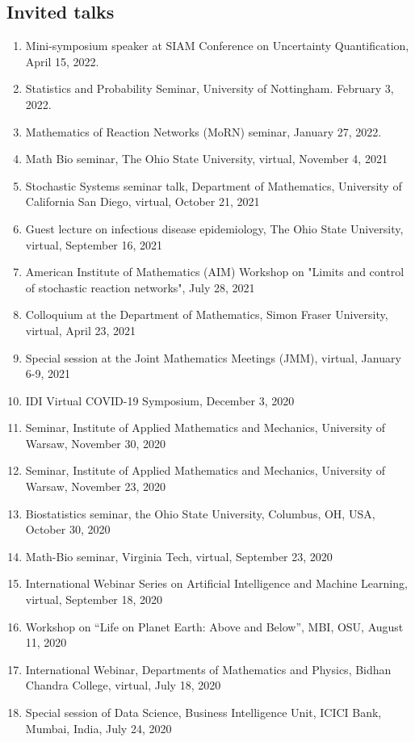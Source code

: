 \documentclass[11pt,a4paper,sans]{moderncv}        %
\begin{document}
\subsection{Invited talks}
\begin{enumerate}
	\item Mini-symposium speaker at SIAM Conference on Uncertainty Quantification, April 15, 2022. 
	\item Statistics and Probability Seminar, University of Nottingham. February 3, 2022. 
	\item Mathematics of Reaction Networks (MoRN) seminar, January 27, 2022. 
	\item Math Bio seminar, The Ohio State University, virtual, November 4, 2021
	\item Stochastic Systems seminar talk, Department of Mathematics, University of California San Diego, virtual, October 21, 2021
	\item Guest lecture on infectious disease epidemiology, The Ohio State University, virtual, September 16, 2021
	\item American Institute of Mathematics (AIM) Workshop on "Limits and control of stochastic reaction networks", July 28, 2021
	\item Colloquium at the Department of Mathematics, Simon Fraser University, virtual, April 23, 2021
	\item Special session at the Joint Mathematics Meetings (JMM), virtual, January 6-9, 2021
	\item IDI Virtual COVID-19 Symposium, December 3, 2020
	\item Seminar, Institute of Applied Mathematics and Mechanics, University of Warsaw, November 30, 2020
	\item Seminar, Institute of Applied Mathematics and Mechanics, University of Warsaw, November 23, 2020
	\item Biostatistics seminar, the Ohio State University, Columbus, OH, USA, October 30, 2020
	\item Math-Bio seminar, Virginia Tech, virtual, September 23, 2020
	\item International Webinar Series on Artificial Intelligence and Machine Learning, virtual, September 18, 2020 
	\item {Workshop on “Life on Planet Earth: Above and Below”, MBI, OSU, August 11, 2020}
	\item {International Webinar, Departments of Mathematics and Physics, Bidhan Chandra College, virtual, July 18, 2020}
	\item {Special session of Data Science, Business Intelligence Unit, ICICI Bank, Mumbai, India, July 24, 2020}

\end{enumerate}
\end{document}
